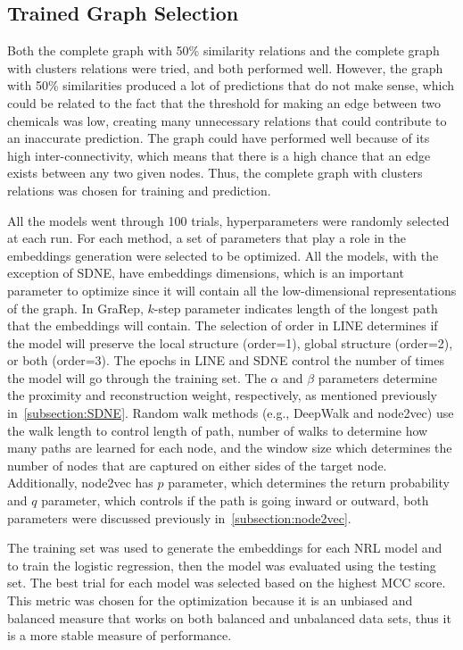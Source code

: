 \subsection{Trained Graph Selection}

Both the complete graph with 50\% similarity relations and the complete graph with clusters relations were tried, and both performed well.
However, the graph with 50\% similarities produced a lot of predictions that do not make sense, which could be related to the fact that the threshold for making an edge between two chemicals was low, creating many unnecessary relations that could contribute to an inaccurate prediction.
The graph could have performed well because of its high inter-connectivity, which means that there is a high chance that an edge exists between any two given nodes.
Thus, the complete graph with clusters relations was chosen for training and prediction.

All the models went through 100 trials, hyperparameters were randomly selected at each run.
For each method, a set of parameters that play a role in the embeddings generation were selected to be optimized.
All the models, with the exception of SDNE, have embeddings dimensions, which is an important parameter to optimize since it will contain all the low-dimensional representations of the graph.
In GraRep, $k$-step parameter indicates length of the longest path that the embeddings will contain.
The selection of order in \ac{LINE} determines if the model will preserve the local structure (order=1), global structure (order=2), or both (order=3).
The epochs in \ac{LINE} and \ac{SDNE} control the number of times the model will go through the training set.
The $\alpha$ and $\beta$ parameters determine the proximity and reconstruction weight, respectively, as mentioned previously in~\ref{subsection:SDNE}.
Random walk methods (e.g., DeepWalk and node2vec) use the walk length to control length of path, number of walks to determine how many paths are learned for each node, and the window size which determines the number of nodes that are captured on either sides of the target node.
Additionally, node2vec has $p$ parameter, which determines the return probability and $q$ parameter, which controls if the path is going inward or outward, both parameters were discussed previously in~\ref{subsection:node2vec}.

The training set was used to generate the embeddings for each \ac{NRL} model and to train the logistic regression, then the model was evaluated using the testing set.
The best trial for each model was selected based on the highest \ac{MCC} score.
This metric was chosen for the optimization because it is an unbiased and balanced measure that works on both balanced and unbalanced data sets, thus it is a more stable measure of performance.

